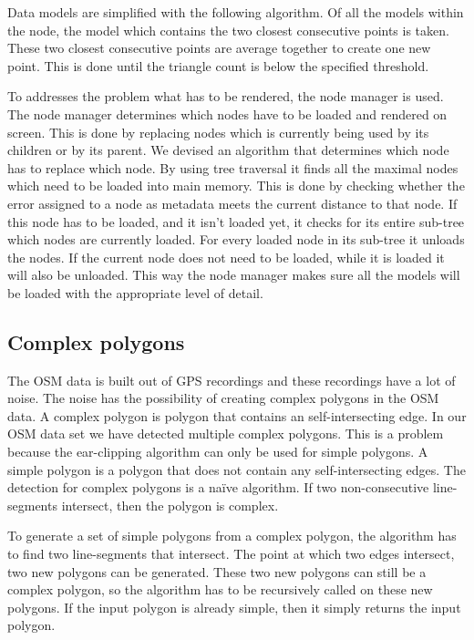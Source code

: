 Data models are simplified with the following algorithm. Of all the models within the node, the model which contains the two closest consecutive points is taken. These two closest consecutive points are average together to create one new point. This is done until the triangle count is below the specified threshold.

To addresses the problem what has to be rendered, the node manager is used. The node manager determines which nodes have to be loaded and rendered on screen. This is done by replacing nodes which is currently being used by its children or by its parent. We devised an algorithm that determines which node has to replace which node. By using tree traversal it finds all the maximal nodes which need to be loaded into main memory. This is done by checking whether the error assigned to a node as metadata meets the current distance to that node. If this node has to be loaded, and it isn’t loaded yet, it checks for its entire sub-tree which nodes are currently loaded. For every loaded node in its sub-tree it unloads the nodes. If the current node does not need to be loaded, while it is loaded it will also be unloaded. This way the node manager makes sure all the models will be loaded with the appropriate level of detail.


\subsection{Complex polygons}
\label{subsec:ComplexPolygons}
The OSM data is built out of GPS recordings and these recordings have a lot of noise. The noise has the possibility of creating complex polygons in the OSM data. A complex polygon is polygon that contains an self-intersecting edge. In our OSM data set we have detected multiple complex polygons. This is a problem because the ear-clipping algorithm can only be used for simple polygons. A simple polygon is a polygon that does not contain any self-intersecting edges. The detection for complex polygons is a naïve algorithm. If two non-consecutive line-segments intersect, then the polygon is complex.

To generate a set of simple polygons from a complex polygon, the algorithm has to find two line-segments that intersect. The point at which two edges intersect, two new polygons can be generated. These two new polygons can still be a complex polygon, so the algorithm has to be recursively called on these new polygons. If the input polygon is already simple, then it simply returns the input polygon.

